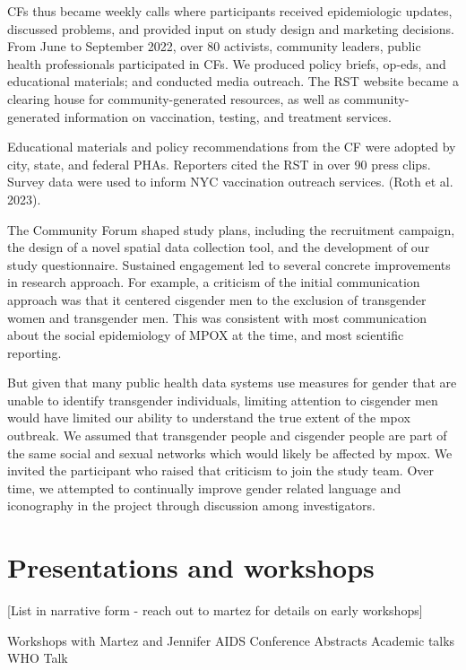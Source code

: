 \documentclass[
  letterpaper,
  DIV=11,
  numbers=noendperiod,
  oneside]{scrreprt}
\begin{document}
CFs thus became weekly calls where participants received epidemiologic
updates, discussed problems, and provided input on study design and
marketing decisions. From June to September 2022, over 80 activists,
community leaders, public health professionals participated in CFs. We
produced policy briefs, op-eds, and educational materials; and conducted
media outreach. The RST website became a clearing house for
community-generated resources, as well as community-generated
information on vaccination, testing, and treatment services.

Educational materials and policy recommendations from the CF were
adopted by city, state, and federal PHAs. Reporters cited the RST in
over 90 press clips. Survey data were used to inform NYC vaccination
outreach services. (Roth et al. 2023).

The Community Forum shaped study plans, including the recruitment
campaign, the design of a novel spatial data collection tool, and the
development of our study questionnaire. Sustained engagement led to
several concrete improvements in research approach. For example, a
criticism of the initial communication approach was that it centered
cisgender men to the exclusion of transgender women and transgender men.
This was consistent with most communication about the social
epidemiology of MPOX at the time, and most scientific reporting.

But given that many public health data systems use measures for gender
that are unable to identify transgender individuals, limiting attention
to cisgender men would have limited our ability to understand the true
extent of the mpox outbreak. We assumed that transgender people and
cisgender people are part of the same social and sexual networks which
would likely be affected by mpox. We invited the participant who raised
that criticism to join the study team. Over time, we attempted to
continually improve gender related language and iconography in the
project through discussion among investigators.

\hypertarget{presentations-and-workshops}{%
\section{Presentations and
workshops}\label{presentations-and-workshops}}

{[}List in narrative form - reach out to martez for details on early
workshops{]}

Workshops with Martez and Jennifer AIDS Conference Abstracts Academic
talks WHO Talk
\end{document}

